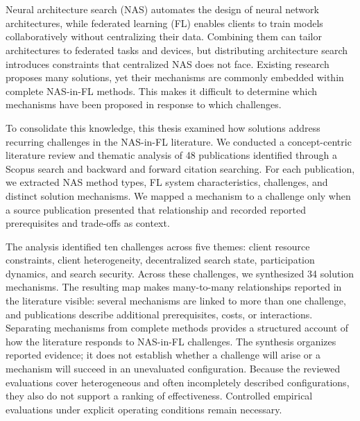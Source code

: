 \chapter{\abstractname}

Neural architecture search (NAS) automates the design of neural network architectures, while federated learning (FL) enables clients to train models collaboratively without centralizing their data. Combining them can tailor architectures to federated tasks and devices, but distributing architecture search introduces constraints that centralized NAS does not face. Existing research proposes many solutions, yet their mechanisms are commonly embedded within complete NAS-in-FL methods. This makes it difficult to determine which mechanisms have been proposed in response to which challenges.

To consolidate this knowledge, this thesis examined how solutions address recurring challenges in the NAS-in-FL literature. We conducted a concept-centric literature review and thematic analysis of 48 publications identified through a Scopus search and backward and forward citation searching. For each publication, we extracted NAS method types, FL system characteristics, challenges, and distinct solution mechanisms. We mapped a mechanism to a challenge only when a source publication presented that relationship and recorded reported prerequisites and trade-offs as context.

The analysis identified ten challenges across five themes: client resource constraints, client heterogeneity, decentralized search state, participation dynamics, and search security. Across these challenges, we synthesized 34 solution mechanisms. The resulting map makes many-to-many relationships reported in the literature visible: several mechanisms are linked to more than one challenge, and publications describe additional prerequisites, costs, or interactions. Separating mechanisms from complete methods provides a structured account of how the literature responds to NAS-in-FL challenges. The synthesis organizes reported evidence; it does not establish whether a challenge will arise or a mechanism will succeed in an unevaluated configuration. Because the reviewed evaluations cover heterogeneous and often incompletely described configurations, they also do not support a ranking of effectiveness. Controlled empirical evaluations under explicit operating conditions remain necessary.
